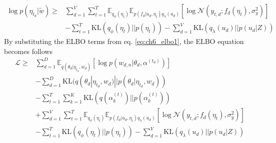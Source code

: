 \begin{align*}
\log p(\eta_{t_d}|\tilde{w})\geq&\sum_{d=1}^{V}\sum_{t=1}^{T}\mathbb{E}_{q_\phi(\eta_t)}\mathbb{E}_{p(f_d|u_d,\eta_t)q_{\lambda}(u_d)}\left[\log\mathcal{N}(y_{t,d};f_d(\eta_t),\sigma_y^2)\right]\\
&-\sum_{t=1}^{T}\text{KL}(q_{\phi}(\eta_t)||p(\eta_t))-\sum_{d=1}^{V}\text{KL}(q_\lambda(u_d)||p(u_d|Z))
\end{align*}
By substituting the ELBO terms from eq. \ref{eq:ch6_elbo1}, the ELBO equation becomes follows
\begin{align}\label{eq:ch6_elbo2}
\mathcal{L}\geq&\sum_{d=1}^{D}\mathbb{E}_{ q(\theta_d|\eta_{t_d},w_d)}[\log p(w_{d,n}|\theta_d,\alpha^{(t_d)})]\\
&-\sum_{d=1}^{D}\text{KL}(q(\theta_d|\eta_{t_d},w_d)||p(\theta_d|\eta_{t_d},w_d))\\
&-\sum_{t=1}^{T}\sum_{k=1}^{K}\text{KL}(q(\alpha_k^{(t)})||p(\alpha_k^{(t)}))\\
&+\sum_{d=1}^{V}\sum_{t=1}^{T}\mathbb{E}_{q_\phi(\eta_t)}\mathbb{E}_{p(f_d|u_d,\eta_t)q_{\lambda}(u_d)}\left[\log\mathcal{N}(y_{t,d};f_d(\eta_t),\sigma_y^2)\right]\\
&-\sum_{t=1}^{T}\text{KL}(q_{\phi}(\eta_t)||p(\eta_t))-\sum_{d=1}^{V}\text{KL}(q_\lambda(u_d)||p(u_d|Z))
\end{align}
